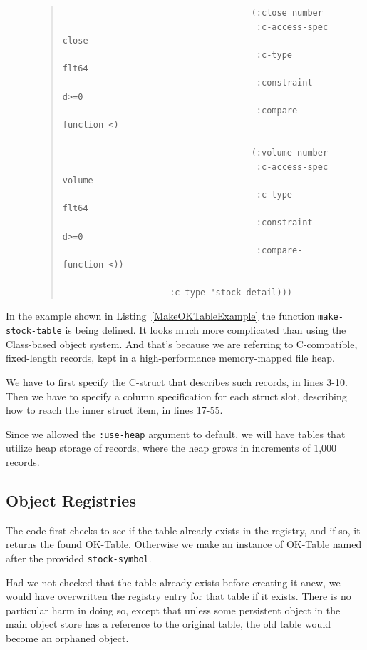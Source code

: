 \documentclass[article,oneside]{memoir}
\begin{document}
\begin{figure}[!htbp]
\begin{quote}
\begin{lstlisting}
                                     (:close number
                                      :c-access-spec    close
                                      :c-type           flt64
                                      :constraint       d>=0
                                      :compare-function <)
                                     
                                     (:volume number
                                      :c-access-spec    volume
                                      :c-type           flt64
                                      :constraint       d>=0
                                      :compare-function <))
                                      
                     :c-type 'stock-detail)))
\end{lstlisting}
\end{quote}
\end{figure}

In the example shown in Listing~\ref{MakeOKTableExample} the function \texttt{make-stock-table} is being defined. It looks much more complicated than using the Class-based object system. And that's because we are referring to C-compatible, fixed-length records, kept in a high-performance memory-mapped file heap.

We have to first specify the C-struct that describes such records, in lines 3-10. Then we have to specify a column specification for each struct slot, describing how to reach the inner struct item, in lines 17-55.

Since we allowed the \texttt{:use-heap} argument to default, we will have tables that utilize heap storage of records, where the heap grows in increments of 1,000 records.

\subsection{Object Registries}

The code first checks to see if the table already exists in the registry, and if so, it returns the found OK-Table. Otherwise we make an instance of OK-Table named after the provided \texttt{stock-symbol}.

Had we not checked that the table already exists before creating it anew, we would have overwritten the registry entry for that table if it exists. There is no particular harm in doing so, except that unless some persistent object in the main object store has a reference to the original table, the old table would become an orphaned object. 
\end{document}

